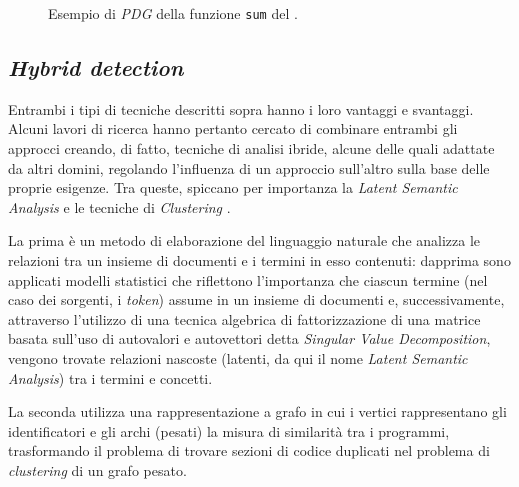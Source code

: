 

\begin{figure}[h!]
    \caption{Esempio di \textit{PDG} della funzione \texttt{sum} del .}
    \label{img:01-pdg}
\end{figure}

\subsection{\textit{Hybrid detection}}
Entrambi i tipi di tecniche descritti sopra hanno i loro vantaggi e svantaggi. 
%
Alcuni lavori di ricerca hanno pertanto cercato di combinare entrambi gli approcci creando, di fatto, tecniche di analisi ibride, alcune delle quali adattate da altri domini, regolando l'influenza di un approccio sull'altro sulla base delle proprie esigenze.
%
Tra queste, spiccano per importanza la \textit{Latent Semantic Analysis} \cite{lsa} e le tecniche di \textit{Clustering} \cite{pdectet}.

La prima è un metodo di elaborazione del linguaggio naturale che analizza le relazioni tra un insieme di documenti e i termini in esso contenuti: dapprima sono applicati modelli statistici che riflettono l'importanza che ciascun termine (nel caso dei sorgenti, i \textit{token}) assume in un insieme di documenti e, successivamente, attraverso l'utilizzo di una tecnica algebrica di fattorizzazione di una matrice basata sull'uso di autovalori e autovettori detta \textit{Singular Value Decomposition}, vengono trovate relazioni nascoste (latenti, da qui il nome \textit{Latent Semantic Analysis}) tra i termini e concetti.

La seconda utilizza una rappresentazione a grafo in cui i vertici rappresentano gli identificatori e gli archi (pesati) la misura di similarità tra i programmi, trasformando il problema di trovare sezioni di codice duplicati nel problema di \textit{clustering} di un grafo pesato.

